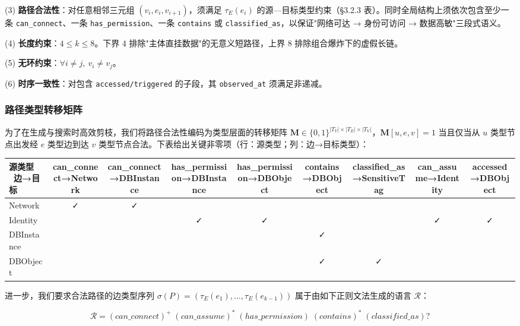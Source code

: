 \documentclass[a4paper,12pt]{ctexart}
\begin{document}
(3) \textbf{路径合法性}：对任意相邻三元组 $(v_i, e_i, v_{i+1})$，须满足 $\tau_E(e_i)$ 的源—目标类型约束（§3.2.3 表）。同时全局结构上须依次包含至少一条 \texttt{can\_connect}、一条 \texttt{has\_permission}、一条 \texttt{contains} 或 \texttt{classified\_as}，以保证"网络可达 → 身份可访问 → 数据高敏"三段式语义。

(4) \textbf{长度约束}：$4 \le k \le 8$。下界 4 排除"主体直挂数据"的无意义短路径，上界 8 排除组合爆炸下的虚假长链。

(5) \textbf{无环约束}：$\forall i \ne j,\ v_i \ne v_j$。

(6) \textbf{时序一致性}：对包含 \texttt{accessed/triggered} 的子段，其 \texttt{observed\_at} 须满足非递减。

\subsubsection{路径类型转移矩阵}

为了在生成与搜索时高效剪枝，我们将路径合法性编码为类型层面的转移矩阵 $\mathbf{M} \in \{0,1\}^{|T_V| \times |T_E| \times |T_V|}$，$\mathbf{M}[u, e, v]=1$ 当且仅当从 $u$ 类型节点出发经 $e$ 类型边到达 $v$ 类型节点合法。下表给出关键非零项（行：源类型；列：边→目标类型）：

\begin{table}[htbp]
\centering
\small
\setlength{\tabcolsep}{4pt}
\begin{tabular}{|l|c|c|c|c|c|c|c|c|}
\hline
\textbf{源类型 \ 边→目标} & \textbf{can\_connect→Network} & \textbf{can\_connect→DBInstance} & \textbf{has\_permission→DBInstance} & \textbf{has\_permission→DBObject} & \textbf{contains→DBObject} & \textbf{classified\_as→SensitiveTag} & \textbf{can\_assume→Identity} & \textbf{accessed→DBObject} \\
\hline
Network & ✓ & ✓ &  &  &  &  &  &  \\
\hline
Identity &  &  & ✓ & ✓ &  &  & ✓ & ✓ \\
\hline
DBInstance &  &  &  &  & ✓ &  &  &  \\
\hline
DBObject &  &  &  &  & ✓ & ✓ &  &  \\
\hline
\end{tabular}
\end{table}

进一步，我们要求合法路径的边类型序列 $\sigma(P) = (\tau_E(e_1), \ldots, \tau_E(e_{k-1}))$ 属于由如下正则文法生成的语言 $\mathcal{R}$：

\[\mathcal{R} = (can\_connect)^{+}\;(can\_assume)^{*}\;(has\_permission)\;(contains)^{*}\;(classified\_as)?\]
\end{document}
